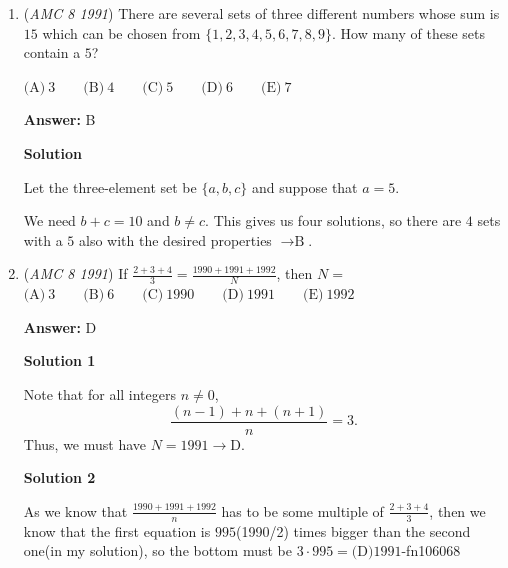 \begin{enumerate}
$\text{(A)}\ 6 \qquad \text{(B)}\ 8 \qquad \text{(C)}\ 12 \qquad \text{(D)}\ 15 \qquad \text{(E)}\ 18$

 \textbf{Answer: }B



\textbf{Solution}

The base is $\overline{BC}=4$. The height has a length of the difference of the y-coordinates of A and B, which is 2. Therefore the area is $4\cdot 2=8\Rightarrow \boxed{\mathrm{B}}$.

 


	\item (\textit{AMC 8 1991}) There are several sets of three different numbers whose sum is $15$ which can be chosen from $\{ 1,2,3,4,5,6,7,8,9 \}$.  How many of these sets contain a $5$?


 $\text{(A)}\ 3 \qquad \text{(B)}\ 4 \qquad \text{(C)}\ 5 \qquad \text{(D)}\ 6 \qquad \text{(E)}\ 7$

 \textbf{Answer: }B



\textbf{Solution}

Let the three-element set be $\{ a,b,c \}$ and suppose that $a=5$.  

 We need $b+c=10$ and $b\neq c$.  This gives us four solutions, so there are $4$ sets with a $5$ also with the desired properties $\rightarrow \boxed{\text{B}}$.

 


	\item (\textit{AMC 8 1991}) If $\frac{2+3+4}{3}=\frac{1990+1991+1992}{N}$, then $N=$
$\text{(A)}\ 3 \qquad \text{(B)}\ 6 \qquad \text{(C)}\ 1990 \qquad \text{(D)}\ 1991 \qquad \text{(E)}\ 1992$

 \textbf{Answer: }D



\textbf{Solution 1}

Note that for all integers $n\neq 0$, 
 \[\frac{(n-1)+n+(n+1)}{n}=3.\]Thus, we must have $N=1991\rightarrow \boxed{\text{D}}$.

 



\textbf{Solution 2}

As we know that $\frac{1990+1991+1992}{n}$ has to be some multiple of $\frac{2+3+4}{3}$, then we know that the first equation is $995$(1990/2) times bigger than the second one(in my solution), so the bottom must be $3\cdot995=\boxed{\text{(D)}1991}$-fn106068

 



\end{enumerate}
